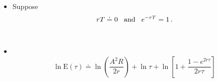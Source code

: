 \documentclass[12pt,compress,handout]{beamer}  %
\begin{document}
\begin{frame}
\begin{itemize}
\item Suppose
\begin{equation*}
rT\doteq 0\text{\hspace{3mm}and\hspace{3mm}}e^{-rT}=1\text{\,.}
\end{equation*}\ \\[13mm]
\item \ \\[-11mm]
\begin{equation*}
\ln \text{E}(\tau )\doteq \ln \left( \frac{A^2R}{2r}\right) +\ln \tau + \ln \left[ 1+\frac{1-e^{2r\tau }}{2r\tau }\right]
\end{equation*}
\end{itemize}
\end{frame}


%
%
%
%
%
%
%
%
%
%
%
%
%
%
%
%
%
%
%
%
%
%
\end{document}
